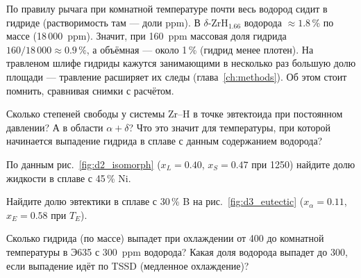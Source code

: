 По правилу рычага при комнатной температуре почти весь водород сидит в гидриде (растворимость там --- доли ppm).
В $\delta$-ZrH$_{1.66}$ водорода $\approx 1.8$\,\% по массе (18\,000~ppm). Значит, при 160~ppm массовая доля
гидрида $160/18\,000 \approx 0.9\,\%$, а объёмная --- около 1\,\% (гидрид менее плотен). На травленом шлифе гидриды
кажутся занимающими в несколько раз большую долю площади --- травление расширяет их следы (глава~\ref{ch:methods}).
Об этом стоит помнить, сравнивая снимки с расчётом.

\begin{exercise}
Сколько степеней свободы у системы Zr--H в точке эвтектоида при постоянном давлении? А в области $\alpha+\delta$?
Что это значит для температуры, при которой начинается выпадение гидрида в сплаве с данным содержанием водорода?
\end{exercise}

\begin{exercise}
По данным рис.~\ref{fig:d2_isomorph} ($x_L = 0.40$, $x_S = 0.47$ при 1250\degC) найдите долю жидкости в сплаве с 45\,\% Ni.
\end{exercise}

\begin{exercise}
Найдите долю эвтектики в сплаве с 30\,\% B на рис.~\ref{fig:d3_eutectic} ($x_\alpha = 0.11$, $x_E = 0.58$ при $T_E$).
\end{exercise}

\begin{exercise}
Сколько гидрида (по массе) выпадет при охлаждении от 400\degC{} до комнатной температуры в Э635 с 300~ppm водорода?
Какая доля водорода выпадет до 300\degC, если выпадение идёт по TSSD (медленное охлаждение)?
\end{exercise}
